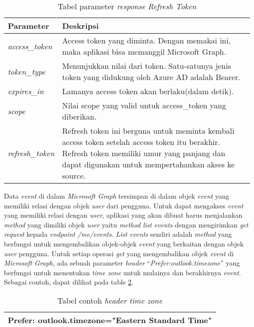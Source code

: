 \documentclass[a4paper,twoside]{article}
\begin{document}
\begin{enumerate}
\begin{table}[H]
	\centering 
	\caption{Tabel parameter \textit{response} \textit{Refresh Token}}
	\label{tab:parameter_response_refresh_token}
	\begin{tabular}{|p{3cm}|p{9cm}|}
	\hline
	 \textbf{Parameter} & \textbf{Deskripsi}\\ \hline 
	 \textit{access\_token} & Access token yang diminta. Dengan memakai ini, maka aplikasi bisa memanggil Microsoft Graph. \\ \hline 
	\textit{token\_type} & Menunjukkan nilai dari token. Satu-satunya jenis token yang didukung oleh Azure AD adalah Bearer.\\ \hline 
	\textit{expires\_in} & Lamanya access token akan berlaku(dalam detik). \\ \hline 
	\textit{scope} & Nilai scope yang valid untuk access\_token yang diberikan.  \\ \hline  
	\textit{refresh\_token} & Refresh token ini berguna untuk meminta kembali access token setelah access token itu berakhir. Refresh token memiliki umur yang panjang dan dapat digunakan untuk mempertahankan akses ke source. \\
	\hline
	\end{tabular}  
\end{table}

Data \textit{event} di dalam \textit{Microsoft Graph} tersimpan di dalam objek \textit{event} yang memiliki relasi dengan objek \textit{user} dari pengguna. Untuk dapat mengakses \textit{event} yang memiliki relasi dengan \textit{user}, aplikasi yang akan dibuat harus menjalankan \textit{method} yang dimiliki objek \textit{user} yaitu \textit{method list events} dengan mengirimkan \textit{get request} kepada \textit{endpoint /me/events}. \textit{List events} sendiri adalah \textit{method} yang berfungsi untuk mengembalikan objek-objek \textit{event} yang berkaitan dengan objek \textit{user} pengguna. Untuk setiap operasi \textit{get} yang mengembalikan objek \textit{event} di \textit{Microsoft Graph}, ada sebuah parameter \textit{header} ``\textit{Prefer:outlook.timezone}'' yang berfungsi untuk menentukan \textit{time zone} untuk mulainya dan berakhirnya \textit{event}. Sebagai contoh, dapat dilihat pada table \ref{tab:contoh_header_time_zone}. 

\begin{table}[H]
	\centering 
	\caption{Tabel contoh \textit{header time zone}}
	\label{tab:contoh_header_time_zone}
	\begin{tabular}{|p{9cm}|}
	\hline
	 Prefer: outlook.timezone="Eastern Standard Time" \\
	\hline
	\end{tabular}  
\end{table}


\end{enumerate}
\end{document}
